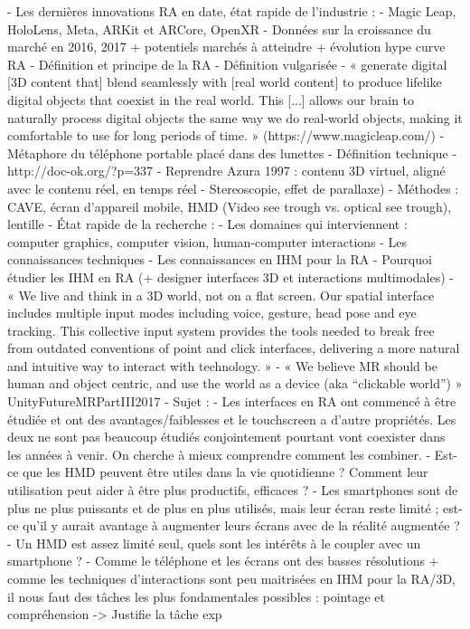 - Les dernières innovations RA en date, état rapide de l'industrie :
  - Magic Leap, HoloLens, Meta, ARKit et ARCore, OpenXR
  - Données sur la croissance du marché en 2016, 2017 + potentiels marchés à atteindre + évolution hype curve RA
- Définition et principe de la RA
  - Définition vulgarisée
    - « generate digital [3D content that] blend seamlessly with [real world content] to produce lifelike digital objects that coexist in the real world. This [...] allows our brain to naturally process digital objects the same way we do real-world objects, making it comfortable to use for long periods of time. » (https://www.magicleap.com/)
    - Métaphore du téléphone portable placé dans des lunettes
  - Définition technique
    - http://doc-ok.org/?p=337
    - Reprendre Azura 1997 : contenu 3D virtuel, aligné avec le contenu réel, en temps réel
    - Stereoscopie, effet de parallaxe)
  - Méthodes : CAVE, écran d'appareil mobile, HMD (Video see trough vs. optical see trough), lentille
- État rapide de la recherche :
  - Les domaines qui interviennent : computer graphics, computer vision, human-computer interactions
  - Les connaissances techniques
  - Les connaissances en IHM pour la RA
- Pourquoi étudier les IHM en RA (+ designer interfaces 3D et interactions multimodales)
  - « We live and think in a 3D world, not on a flat screen. Our spatial interface includes multiple input modes including voice, gesture, head pose and eye tracking. This collective input system provides the tools needed to break free from outdated conventions of point and click interfaces, delivering a more natural and intuitive way to interact with technology. »
  - « We believe MR should be human and object centric, and use the world as a device (aka “clickable world”) » UnityFutureMRPartIII2017
- Sujet :
  - Les interfaces en RA ont commencé à être étudiée et ont des avantages/faiblesses et le touchscreen a d'autre propriétés. Les deux ne sont pas beaucoup étudiés conjointement pourtant vont coexister dans les années à venir. On cherche à mieux comprendre comment les combiner.
    - Est-ce que les HMD peuvent être utiles dans la vie quotidienne ? Comment leur utilisation peut aider à être plus productifs, efficaces ?
    - Les smartphones sont de plus ne plus puissants et de plus en plus utilisés, mais leur écran reste limité ; est-ce qu'il y aurait avantage à augmenter leurs écrans avec de la réalité augmentée ?
    - Un HMD est assez limité seul, quels sont les intérêts à le coupler avec un smartphone ?
    - Comme le téléphone et les écrans ont des basses résolutions + comme les techniques d'interactions sont peu maitrisées en IHM pour la RA/3D, il nous faut des tâches les plus fondamentales possibles : pointage et  compréhension -> Justifie la tâche exp
